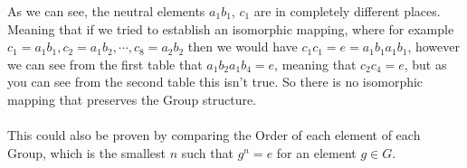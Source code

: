 \documentclass[]{scrartcl}
\begin{document}
As we can see, the neutral elements $a_1b_1$, $c_1$ are in completely different places. Meaning that if we tried to establish an isomorphic mapping, where for example $c_1 = a_1b_1, c_2 = a_1b_2, \cdots, c_8 = a_2b_2$ then we would have $c_1c_1 = e = a_1b_1 a_1b_1$, however we can see from the first table that $a_1b_2 a_1b_4 = e$, meaning that $c_2c_4 = e$, but as you can see from the second table this isn't true. So there is no isomorphic mapping that preserves the Group structure.\\\\
This could also be proven by comparing the Order of each element of each Group, which is the smallest $n$ such that $g^n = e$ for an element $g\in G$.
\end{document}
